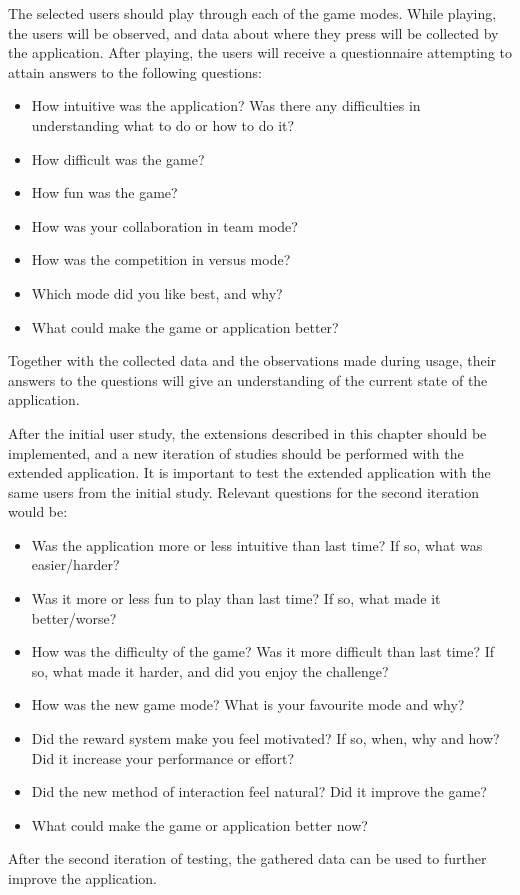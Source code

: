 The selected users should play through each of the game modes. While playing, the users will be observed, and data about where they press will be collected by the application. After playing, the users will receive a questionnaire attempting to attain answers to the following questions:

\begin{itemize}
	\item How intuitive was the application? Was there any difficulties in understanding what to do or how to do it?
	\item How difficult was the game?
	\item How fun was the game?
	\item How was your collaboration in team mode?
	\item How was the competition in versus mode?
	\item Which mode did you like best, and why?
	\item What could make the game or application better?
\end{itemize}

Together with the collected data and the observations made during usage, their answers to the questions will give an understanding of the current state of the application.

After the initial user study, the extensions described in this chapter should be implemented, and a new iteration of studies should be performed with the extended application. It is important to test the extended application with the same users from the initial study. Relevant questions for the second iteration would be:

\begin{itemize}
	\item Was the application more or less intuitive than last time? If so, what was easier/harder?
	\item Was it more or less fun to play than last time? If so, what made it better/worse?
	\item How was the difficulty of the game? Was it more difficult than last time? If so, what made it harder, and did you enjoy the challenge?
	\item How was the new game mode? What is your favourite mode and why?
	\item Did the reward system make you feel motivated? If so, when, why and how? Did it increase your performance or effort?
	\item Did the new method of interaction feel natural? Did it improve the game?
	\item What could make the game or application better now?
\end{itemize}

After the second iteration of testing, the gathered data can be used to further improve the application.